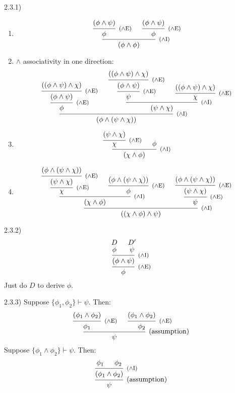 \documentclass{article}
\theoremstyle{definition}
\newcommand{\ci}{\footnotesize ($\wedge$I)}
\newcommand{\ce}{\footnotesize ($\wedge$E)}
\begin{document}
2.3.1)
\begin{enumerate}
  \item
  \[
    \begin{prooftree}
      \hypo{(\phi\land\psi)}
      \infer1[\ce]{\phi}
      \hypo{(\phi\land\psi)}
      \infer1[\ce]{\phi}
      \infer2[\ci]{(\phi\land\phi)}
    \end{prooftree}
  \]

  \item \(\land\) associativity in one direction:
  \[
    \begin{prooftree}
      \hypo{((\phi\land\psi)\land\chi)}
      \infer1[\ce]{(\phi\land\psi)}
      \infer1[\ce]{\phi}
      \hypo{((\phi\land\psi)\land\chi)}
      \infer1[\ce]{(\phi\land\psi)}
      \infer1[\ce]{\psi}
      \hypo{((\phi\land\psi)\land\chi)}
      \infer1[\ce]{\chi}
      \infer2[\ci]{(\psi\land\chi)}
      \infer2[\ci]{(\phi\land(\psi\land\chi))}
    \end{prooftree}
  \]
  \item 
  \[
    \begin{prooftree}
      \hypo{(\psi\land\chi)}
      \infer1[\ce]{\chi}
      \hypo{\phi}
      \infer2[\ci]{(\chi\land\phi)}
    \end{prooftree}
  \]
  \item 
  \[
    \begin{prooftree}
      \hypo{(\phi\land(\psi\land\chi))}
      \infer1[\ce]{(\psi\land\chi)}
      \infer1[\ce]{\chi}
      \hypo{(\phi\land(\psi\land\chi))}
      \infer1[\ce]{\phi}
      \infer2[\ci]{(\chi\land\phi)}
      \hypo{(\phi\land(\psi\land\chi))}
      \infer1[\ce]{(\psi\land\chi)}
      \infer1[\ce]{\psi}
      \infer2[\ci]{((\chi\land\phi)\land\psi)}
    \end{prooftree}
  \]
\end{enumerate}

2.3.2)
  \[
    \begin{prooftree}
      \hypo{D}
      \infer[rule style=no rule]1{\phi}
      \hypo{D'}
      \infer[rule style=no rule]1{\psi}
      \infer2[\ci]{(\phi\land\psi)}
      \infer1[\ce]{\phi}
    \end{prooftree}
  \]
  Just do $D$ to derive $\phi$.

2.3.3) Suppose \(\{\phi_1, \phi_2\} \vdash \psi\). Then:
  \[
    \begin{prooftree}
      \hypo{(\phi_1\land\phi_2)}
      \infer1[\ce]{\phi_1}
      \hypo{(\phi_1\land\phi_2)}
      \infer1[\ce]{\phi_2}
      \infer2[(assumption)]{\psi}
    \end{prooftree}
  \]
Suppose \(\{\phi_1\land\phi_2\} \vdash \psi\). Then:
  \[
    \begin{prooftree}
      \hypo{\phi_1}
      \hypo{\phi_2}
      \infer2[\ci]{(\phi_1\land\phi_2)}
      \infer1[(assumption)]{\psi}
    \end{prooftree}
  \]
\end{document}
